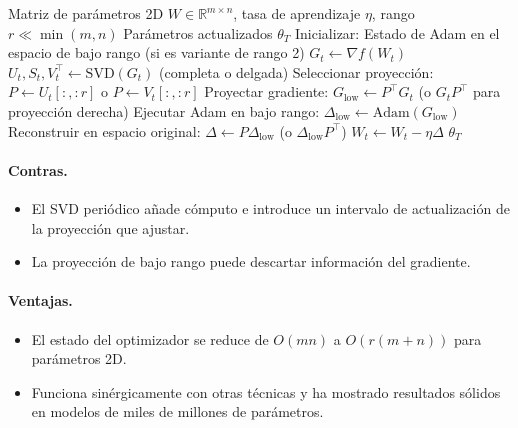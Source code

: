 \begin{algorithm}[H]
\caption{GaLore (Gradient Low-Rank Projection)}
\label{alg:galore}
\begin{algorithmic}[1]
\Require Matriz de parámetros 2D $W \in \mathbb{R}^{m \times n}$, tasa de aprendizaje $\eta$, rango $r \ll \min(m,n)$
\Ensure Parámetros actualizados $\theta_T$
\State Inicializar: Estado de Adam en el espacio de bajo rango (si es variante de rango 2)
    \State $G_t \gets \nabla f(W_t)$
      
        \State $U_t, S_t, V_t^\top \gets \text{SVD}(G_t)$ (completa o delgada)
        \State Seleccionar proyección: $P \gets U_t[:, :r]$ o $P \gets V_t[:, :r]$
    \EndIf
    \State Proyectar gradiente: $G_{\text{low}} \gets P^\top G_t$ (o $G_t P^\top$ para proyección derecha)
    \State Ejecutar Adam en bajo rango: $\Delta_{\text{low}} \gets \text{Adam}(G_{\text{low}})$
    \State Reconstruir en espacio original: $\Delta \gets P \Delta_{\text{low}}$ (o $\Delta_{\text{low}} P^\top$)
    \State $W_t \gets W_t - \eta \Delta$
\EndFor
\Return $\theta_T$
\end{algorithmic}
\end{algorithm}

\paragraph{Contras.}
\begin{itemize}[leftmargin=*]
\item El SVD periódico añade cómputo e introduce un intervalo de actualización de la proyección que ajustar.
\item La proyección de bajo rango puede descartar información del gradiente.
\end{itemize}

\paragraph{Ventajas.}
\begin{itemize}[leftmargin=*]
\item El estado del optimizador se reduce de $O(mn)$ a $O(r(m+n))$ para parámetros 2D.
\item Funciona sinérgicamente con otras técnicas y ha mostrado resultados sólidos en modelos de miles de millones de parámetros.
\end{itemize}


